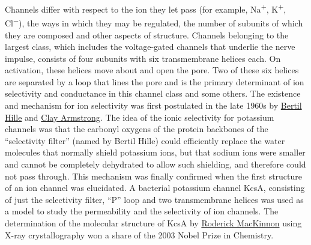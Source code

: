Channels differ with respect to the ion they let pass (for example, Na\textsuperscript{+}, K\textsuperscript{+}, Cl\textsuperscript{−}), the ways in which they may be regulated, the number of subunits of which they are composed and other aspects of structure. Channels belonging to the largest class, which includes the voltage-gated channels that underlie the nerve impulse, consists of four subunits with six transmembrane helices each. On activation, these helices move about and open the pore. Two of these six helices are separated by a loop that lines the pore and is the primary determinant of ion selectivity and conductance in this channel class and some others. The existence and mechanism for ion selectivity was first postulated in the late 1960s by \href{https://en.wikipedia.org/wiki/Bertil_Hille}{Bertil Hille} and \href{https://en.wikipedia.org/wiki/Clay_Armstrong}{Clay Armstrong}. The idea of the ionic selectivity for potassium channels was that the carbonyl oxygens of the protein backbones of the ``selectivity filter'' (named by Bertil Hille) could efficiently replace the water molecules that normally shield potassium ions, but that sodium ions were smaller and cannot be completely dehydrated to allow such shielding, and therefore could not pass through. This mechanism was finally confirmed when the first structure of an ion channel was elucidated. A bacterial potassium channel KcsA, consisting of just the selectivity filter, ``P'' loop and two transmembrane helices was used as a model to study the permeability and the selectivity of ion channels. The determination of the molecular structure of KcsA by \href{https://en.wikipedia.org/wiki/Roderick_MacKinnon}{Roderick MacKinnon} using X-ray crystallography won a share of the 2003 Nobel Prize in Chemistry.



